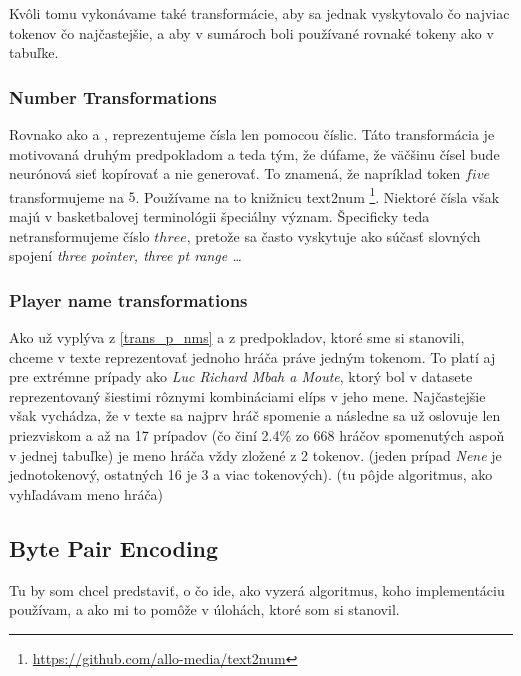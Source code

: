 Kvôli tomu vykonávame také transformácie, aby sa jednak vyskytovalo čo najviac tokenov čo najčastejšie, a aby v sumároch boli používané rovnaké tokeny ako v tabuľke.

\subsubsection{Number Transformations}

Rovnako ako \citep{wiseman2017} a \citep{puduppully2019datatotext}, reprezentujeme čísla len pomocou číslic. Táto transformácia je motivovaná druhým predpokladom a teda tým, že dúfame, že väčšinu čísel bude neurónová sieť kopírovať a nie generovať. To znamená, že napríklad token $five$ transformujeme na $5$. Používame na to knižnicu text2num \footnote[1]{\url{https://github.com/allo-media/text2num}}. Niektoré čísla však majú v basketbalovej terminológii špeciálny význam. Špecificky teda netransformujeme číslo $three$, pretože sa často vyskytuje ako súčasť slovných spojení \emph{three pointer, three pt range \dots}

\subsubsection{Player name transformations}

Ako už vyplýva z \ref{trans_p_nms} a z predpokladov, ktoré sme si stanovili, chceme v texte reprezentovať jednoho hráča práve jedným tokenom. To platí aj pre extrémne prípady ako \emph{Luc Richard Mbah a Moute}, ktorý bol v datasete reprezentovaný šiestimi rôznymi kombináciami elíps v jeho mene. Najčastejšie však vychádza, že v texte sa najprv hráč spomenie a následne sa už oslovuje len priezviskom a až na 17 prípadov (čo činí 2.4\% zo 668 hráčov spomenutých aspoň v jednej tabuľke) je meno hráča vždy zložené z 2 tokenov. (jeden prípad \emph{Nene} je jednotokenový, ostatných 16 je 3 a viac tokenových). (tu pôjde algoritmus, ako vyhľadávam meno hráča)

\subsection{Byte Pair Encoding}

Tu by som chcel predstaviť, o čo ide, ako vyzerá algoritmus, koho implementáciu používam, a ako mi to pomôže v úlohách, ktoré som si stanovil.